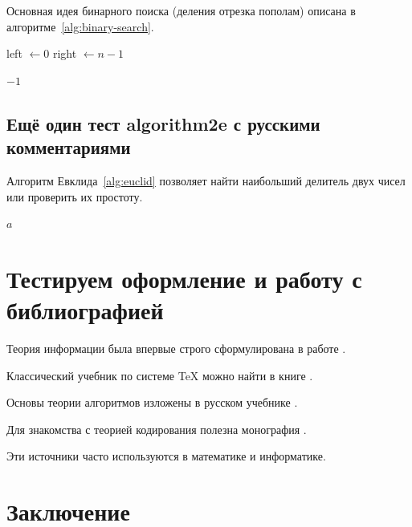 \documentclass[12pt]{extreport}
\begin{document}
Основная идея бинарного поиска (деления отрезка пополам) описана в алгоритме~\ref{alg:binary-search}.

\begin{algorithm}[H]

left $\gets 0$\;
right $\gets n - 1$\;


\KwRet $-1$\;
\caption{\label{alg:binary-search}Бинарный поиск}
\end{algorithm}
\section{Ещё один тест algorithm2e с русскими комментариями}
\label{sec:orge8b96b6}

Алгоритм Евклида~\ref{alg:euclid} позволяет найти наибольший делитель двух чисел или проверить их простоту.

\begin{algorithm}[H]

\KwRet $a$\;
\caption{\label{alg:euclid}Алгоритм Евклида}
\end{algorithm}
\chapter{Тестируем оформление и работу с библиографией}
\label{sec:orgf02772c}

Теория информации была впервые строго сформулирована в работе
\autocite{Shannon1948}.

Классический учебник по системе \TeX{} можно найти в книге \autocite{Knuth1984}.

Основы теории алгоритмов изложены в русском учебнике \autocite{aho1979}.

Для знакомства с теорией кодирования полезна монография \autocite{macwilliams1979}.

Эти источники часто используются в математике и информатике.
\chapter*{Заключение}
\label{sec:org4bfd932}
\end{document}
